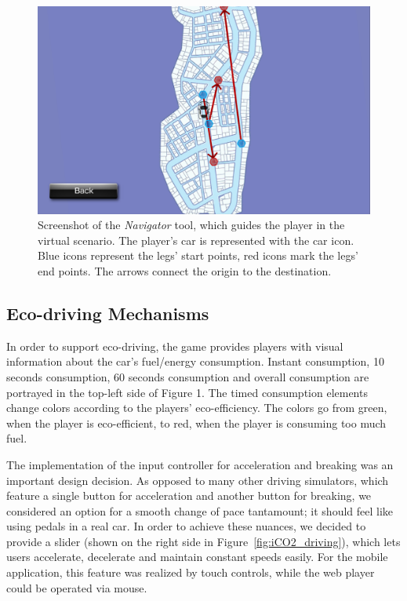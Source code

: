 \documentclass[preprint,authoryear,12pt]{elsarticle}
\begin{document}
\begin{figure}[htb]
\begin{center}
\includegraphics[width=.95\linewidth]{ijhcs14-img/iCO2_navigator}
\caption{Screenshot of the \textit{Navigator} tool, which guides the player in the virtual scenario. The player's car is represented with the car icon. Blue icons represent the legs' start points, red icons mark the legs' end points. The arrows connect the origin to the destination.\label{fig:iCO2_navigator}}
\end{center}
\end{figure}

\subsection{Eco-driving Mechanisms}

In order to support eco-driving, the game provides players with visual information about the car's fuel/energy consumption. Instant consumption, 10 seconds consumption, 60 seconds consumption and overall consumption are portrayed in the top-left side of Figure 1. The timed consumption elements change colors according to the players' eco-efficiency. The colors go from green, when the player is eco-efficient, to red, when the player is consuming too much fuel.

The implementation of the input controller for acceleration and breaking was an important design decision. As opposed to many other driving simulators, which feature a single button for acceleration and another button for breaking, we considered an option for a smooth change of pace tantamount; it should feel like using pedals in a real car. In order to achieve these nuances, we decided to provide a slider (shown on the right side in Figure~\ref{fig:iCO2_driving}), which lets users accelerate, decelerate and maintain constant speeds easily. For the mobile application, this feature was realized by touch controls, while the web player could be operated via mouse.
\end{document}
